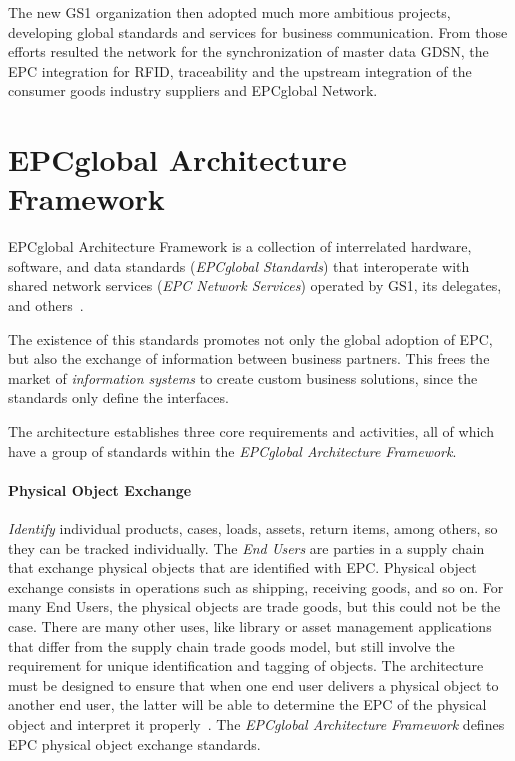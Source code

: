 The new GS1 organization then adopted much more ambitious projects, developing global standards and services for business communication.
From those efforts resulted the network for the synchronization of master data \gls{GDSN}, the \gls{EPC} integration for \gls{RFID}, traceability and the upstream integration of the consumer goods industry suppliers and EPCglobal Network.

\section{EPCglobal Architecture Framework}

EPCglobal Architecture Framework is a collection of interrelated hardware, software, and data standards (\emph{EPCglobal Standards}) that interoperate with shared network services (\emph{EPC Network Services}) operated by GS1, its delegates, and others~\cite{Architecture6framework20140414Pdf}.

The existence of this standards promotes not only the global adoption of \gls{EPC}, but also the exchange of information between business partners. This frees the market of \emph{information systems} to create custom business solutions, since the standards only define the interfaces.

The architecture establishes three core requirements and activities, all of which have a group of standards within the \emph{EPCglobal Architecture Framework}.

\paragraph{Physical Object Exchange} 

\emph{Identify} individual products, cases, loads, assets, return items, among others, so they can be tracked individually.
The \emph{End Users} are parties in a supply chain that exchange physical objects that are identified with \gls{EPC}.
Physical object exchange consists in operations such as shipping, receiving goods, and so on.
For many End Users, the physical objects are trade goods, but this could not be the case.
There are many other uses, like library or asset management applications~\cite{dong-yingliDesignInternetThings2016} that differ from the \gls{supply chain} trade goods model, but still involve the requirement for unique identification and tagging of objects. 
The architecture must be designed to ensure that when one end user delivers a physical object to another end user, the latter will be able to determine the \gls{EPC} of the physical object and interpret it properly~\cite{Architecture6framework20140414Pdf}.
The \emph{EPCglobal Architecture Framework} defines \gls{EPC} physical object exchange standards.


